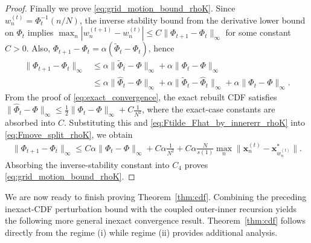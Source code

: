 \documentclass{article}
\newcommand{\bx}{\mathbf{x}}
\newcommand{\Farc}{\Phi}
\begin{document}
\begin{proof}
Finally we prove \eqref{eq:grid_motion_bound_rhoK}. Since $w_n^{(t)}=\Farc_t^{-1}(n/N)$, the inverse stability bound from the derivative lower bound on $\Farc_t$ implies $\max_n|w_n^{(t+1)}-w_n^{(t)}|\le C\|\Farc_{t+1}-\Farc_t\|_\infty$ for some constant $C>0$.
Also, $\Farc_{t+1}-\Farc_t=\alpha(\tilde \Farc_t-\Farc_t)$, hence
\begin{align}
\|\Farc_{t+1}-\Farc_t\|_\infty
&\le \alpha\|\tilde \Farc_t-\Farc\|_\infty+\alpha\|\Farc_t-\Farc\|_\infty \nonumber\\
&\le \alpha\|\hat \Farc_t-\Farc\|_\infty+\alpha\|\tilde \Farc_t-\hat \Farc_t\|_\infty+\alpha\|\Farc_t-\Farc\|_\infty.
\label{eq:Fmove_split_rhoK}
\end{align}
From the proof of \eqref{eq:exact_convergence}, the exact rebuilt CDF satisfies $\|\hat \Farc_t-\Farc\|_\infty\le \frac12\|\Farc_t-\Farc\|_\infty+C\frac{1}{N^2}$, where the exact-case constants are absorbed into $C$. Substituting this and \eqref{eq:Ftilde_Fhat_by_innererr_rhoK} into \eqref{eq:Fmove_split_rhoK}, we obtain
\begin{align}
\|\Farc_{t+1}-\Farc_t\|_\infty \le C\alpha\|\Farc_t-\Farc\|_\infty+C\alpha\frac{1}{N^2}+C\alpha\frac{N}{s(1)}\max_n\|\bx_n^{(t)}-\bx_{w_n^{(t)}}^*\|.
\end{align}
Absorbing the inverse-stability constant into $C_4$ proves \eqref{eq:grid_motion_bound_rhoK}.
\end{proof}

We are now ready to finish proving Theorem~\ref{thm:cdf}. Combining the preceding inexact-CDF perturbation bound with the coupled outer-inner recursion yields the following more general inexact convergence result. Theorem~\ref{thm:cdf} follows directly from the regime (i) while regime (ii) provides additional analysis.
\end{document}
